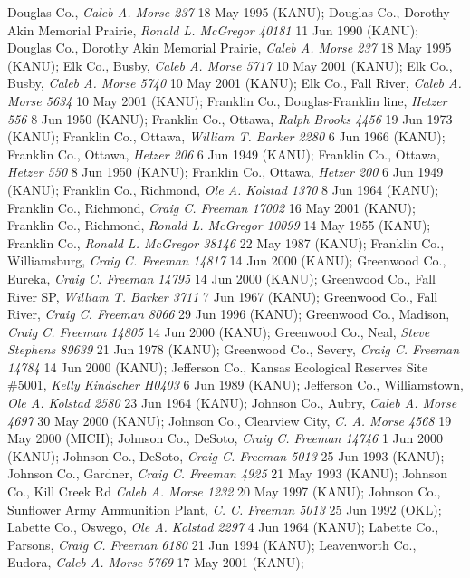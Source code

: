 \documentclass{article}
\begin{document}
Douglas Co., \textit{Caleb A. Morse 237} 18 May 1995 (KANU); 
Douglas Co., Dorothy Akin Memorial Prairie, \textit{Ronald L. McGregor 40181} 11 Jun 1990 (KANU); 
Douglas Co., Dorothy Akin Memorial Prairie, \textit{Caleb A. Morse 237} 18 May 1995 (KANU); 
Elk Co., Busby, \textit{Caleb A. Morse 5717} 10 May 2001 (KANU); 
Elk Co., Busby, \textit{Caleb A. Morse 5740} 10 May 2001 (KANU); 
Elk Co., Fall River, \textit{Caleb A. Morse 5634} 10 May 2001 (KANU); 
Franklin Co., Douglas-Franklin line, \textit{Hetzer 556} 8 Jun 1950 (KANU); 
Franklin Co., Ottawa, \textit{Ralph Brooks 4456} 19 Jun 1973 (KANU); 
Franklin Co., Ottawa, \textit{William T. Barker 2280} 6 Jun 1966 (KANU); 
Franklin Co., Ottawa, \textit{Hetzer 206} 6 Jun 1949 (KANU); 
Franklin Co., Ottawa, \textit{Hetzer 550} 8 Jun 1950 (KANU); 
Franklin Co., Ottawa, \textit{Hetzer 200} 6 Jun 1949 (KANU); 
Franklin Co., Richmond, \textit{Ole A. Kolstad 1370} 8 Jun 1964 (KANU); 
Franklin Co., Richmond, \textit{Craig C. Freeman 17002} 16 May 2001 (KANU); 
Franklin Co., Richmond, \textit{Ronald L. McGregor 10099} 14 May 1955 (KANU); 
Franklin Co., \textit{Ronald L. McGregor 38146} 22 May 1987 (KANU); 
Franklin Co., Williamsburg, \textit{Craig C. Freeman 14817} 14 Jun 2000 (KANU); 
Greenwood Co., Eureka, \textit{Craig C. Freeman 14795} 14 Jun 2000 (KANU); 
Greenwood Co., Fall River SP, \textit{William T. Barker 3711} 7 Jun 1967 (KANU); 
Greenwood Co., Fall River, \textit{Craig C. Freeman 8066} 29 Jun 1996 (KANU); 
Greenwood Co., Madison, \textit{Craig C. Freeman 14805} 14 Jun 2000 (KANU); 
Greenwood Co., Neal, \textit{Steve Stephens 89639} 21 Jun 1978 (KANU); 
Greenwood Co., Severy, \textit{Craig C. Freeman 14784} 14 Jun 2000 (KANU); 
Jefferson Co., Kansas Ecological Reserves Site \#5001, \textit{Kelly Kindscher H0403} 6 Jun 1989 (KANU); 
Jefferson Co., Williamstown, \textit{Ole A. Kolstad 2580} 23 Jun 1964 (KANU); 
Johnson Co., Aubry, \textit{Caleb A. Morse 4697} 30 May 2000 (KANU); 
Johnson Co., Clearview City, \textit{C. A. Morse 4568} 19 May 2000 (MICH); 
Johnson Co., DeSoto, \textit{Craig C. Freeman 14746} 1 Jun 2000 (KANU); 
Johnson Co., DeSoto, \textit{Craig C. Freeman 5013} 25 Jun 1993 (KANU); 
Johnson Co., Gardner, \textit{Craig C. Freeman 4925} 21 May 1993 (KANU); 
Johnson Co., Kill Creek Rd \textit{Caleb A. Morse 1232} 20 May 1997 (KANU); 
Johnson Co., Sunflower Army Ammunition Plant, \textit{C. C. Freeman 5013} 25 Jun 1992 (OKL); 
Labette Co., Oswego, \textit{Ole A. Kolstad 2297} 4 Jun 1964 (KANU); 
Labette Co., Parsons, \textit{Craig C. Freeman 6180} 21 Jun 1994 (KANU); 
Leavenworth Co., Eudora, \textit{Caleb A. Morse 5769} 17 May 2001 (KANU); 
\end{document}

